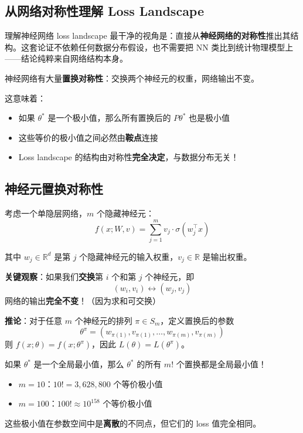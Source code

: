 \documentclass[12pt, a4paper]{ctexart}
\begin{document}
\subsection{从网络对称性理解 Loss Landscape}

理解神经网络 loss landscape 最干净的视角是：直接从\textbf{神经网络的对称性}推出其结构。这套论证不依赖任何数据分布假设，也不需要把 NN 类比到统计物理模型上——结论纯粹来自网络结构本身。

\begin{mathbox}[核心思想]
神经网络有大量\textbf{置换对称性}：交换两个神经元的权重，网络输出不变。

这意味着：
\begin{itemize}
    \item 如果 $\theta^*$ 是一个极小值，那么所有置换后的 $P\theta^*$ 也是极小值
    \item 这些等价的极小值之间必然由\textbf{鞍点}连接
    \item Loss landscape 的结构由对称性\textbf{完全决定}，与数据分布无关！
\end{itemize}
\end{mathbox}

\subsection{神经元置换对称性}

\begin{blackboard}

考虑一个单隐层网络，$m$ 个隐藏神经元：
\[
f(x; W, v) = \sum_{j=1}^{m} v_j \cdot \sigma(w_j^\top x)
\]

其中 $w_j \in \mathbb{R}^d$ 是第 $j$ 个隐藏神经元的输入权重，$v_j \in \mathbb{R}$ 是输出权重。

\textbf{关键观察}：如果我们\textbf{交换}第 $i$ 个和第 $j$ 个神经元，即
\[
(w_i, v_i) \leftrightarrow (w_j, v_j)
\]
网络的输出\textbf{完全不变}！（因为求和可交换）

\textbf{推论}：对于任意 $m$ 个神经元的排列 $\pi \in S_m$，定义置换后的参数
\[
\theta^\pi = (w_{\pi(1)}, v_{\pi(1)}, \ldots, w_{\pi(m)}, v_{\pi(m)})
\]
则 $f(x; \theta) = f(x; \theta^\pi)$，因此 $L(\theta) = L(\theta^\pi)$。

\end{blackboard}

\begin{keypoint}[对称性带来的极小值数量]
如果 $\theta^*$ 是一个全局最小值，那么 $\theta^*$ 的所有 $m!$ 个置换都是全局最小值！

\begin{itemize}
    \item $m = 10$：$10! = 3,628,800$ 个等价极小值
    \item $m = 100$：$100! \approx 10^{158}$ 个等价极小值
\end{itemize}

这些极小值在参数空间中是\textbf{离散}的不同点，但它们的 loss 值完全相同。
\end{keypoint}
\end{document}
